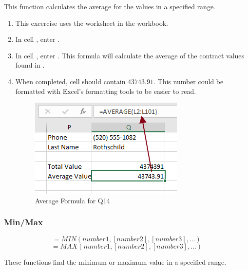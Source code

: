 This function calculates the average for the values in a specified range. 

\begin{enumerate}
	\item This excercise uses the  worksheet in the  workbook.
	\item In cell , enter .
	\item In cell , enter . This formula will calculate the average of the contract values found in .
	\item When completed, cell  should contain $ 43743.91 $. This number could be formatted with Excel's formatting tools to be easier to read.

	\begin{figure}[H]
		\centering
		\includegraphics[width=\maxwidth{.75\linewidth}]{gfx/ch09_fig39}
		\caption{Average Formula for Q14}
		\label{09:fig39}
	\end{figure}

\end{enumerate}

\subsubsection{Min/Max}

\[ =MIN(number1, [number2], [number3], ...) \]
\[ =MAX(number1, [number2], [number3], ...) \]

These functions find the minimum or maximum value in a specified range. 

